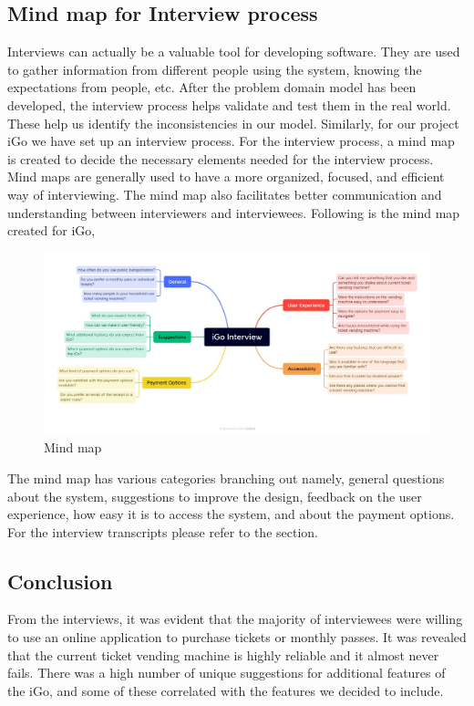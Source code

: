 \documentclass{article}
\begin{document}
\subsection{Mind map for Interview process}
Interviews can actually be a valuable tool for developing software. They are used to gather information from different people using the system, knowing the expectations from people, etc. After the problem domain model has been developed, the interview process helps validate and test them in the real world. These help us identify the inconsistencies in our model. 
Similarly, for our project iGo we have set up an interview process. For the interview process, a mind map is created to decide the necessary elements needed for the interview process. Mind maps are generally used to have a more organized, focused, and efficient way of interviewing. The mind map also facilitates better communication and understanding between interviewers and interviewees. 
Following is the mind map created for iGo, 
\begin{figure}[h]
    \centering
    \includegraphics[scale=0.3]{Mind map.jpeg}
    \caption{Mind map}
    \label{fig:map}
\end{figure}

The mind map has various categories branching out namely, general questions about the system, suggestions to improve the design, feedback on the user experience, how easy it is to access the system, and about the payment options. For the interview transcripts please refer to the  section. 

\subsection{Conclusion}
From the interviews, it was evident that the majority of interviewees were willing to use an online application to purchase tickets or monthly passes. It was revealed that the current ticket vending machine is highly reliable and it almost never fails. There was a high number of unique suggestions for additional features of the iGo, and some of these correlated with the features we decided to include.
\pagebreak
\end{document}
